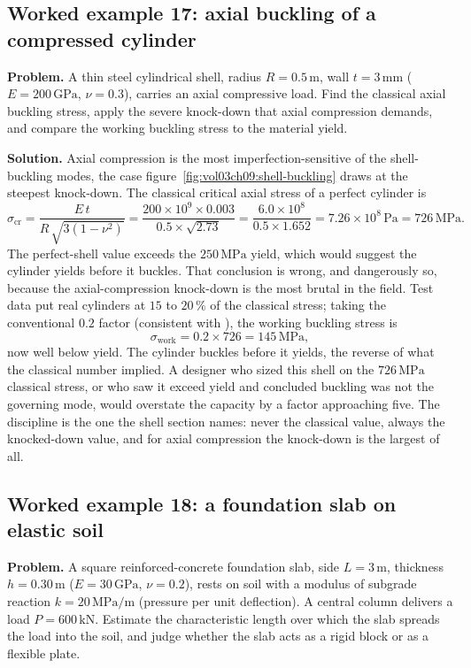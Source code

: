 \subsection*{Worked example 17: axial buckling of a compressed cylinder}

\textbf{Problem.} A thin steel cylindrical shell, radius $R = 0.5\,\si{
\meter}$, wall $t = 3\,\si{\milli\meter}$ ($E = 200\,\text{GPa}$,
$\nu = 0.3$), carries an axial compressive load. Find the classical axial
buckling stress, apply the severe knock-down that axial compression
demands, and compare the working buckling stress to the material yield.

\textbf{Solution.} Axial compression is the most imperfection-sensitive of
the shell-buckling modes, the case figure~\ref{fig:vol03ch09:shell-buckling}
draws at the steepest knock-down. The classical critical axial stress of a
perfect cylinder is
\[
\sigma_{\text{cr}} = \frac{E\, t}{R\,\sqrt{3(1-\nu^2)}}
= \frac{200\times 10^9 \times 0.003}{0.5 \times \sqrt{2.73}}
= \frac{6.0\times 10^8}{0.5 \times 1.652}
= 7.26\times 10^{8}\,\text{Pa} = 726\,\text{MPa}.
\]
The perfect-shell value exceeds the $250\,\text{MPa}$ yield, which would
suggest the cylinder yields before it buckles. That conclusion is wrong,
and dangerously so, because the axial-compression knock-down is the most
brutal in the field. Test data put real cylinders at $15$ to $20\,\%$ of
the classical stress; taking the conventional $0.2$ factor (consistent
with ), the working buckling stress is
\[
\sigma_{\text{work}} = 0.2 \times 726 = 145\,\text{MPa},
\]
now well below yield. The cylinder buckles before it yields, the reverse
of what the classical number implied. A designer who sized this shell on
the $726\,\text{MPa}$ classical stress, or who saw it exceed yield and
concluded buckling was not the governing mode, would overstate the
capacity by a factor approaching five. The discipline is the one the shell
section names: never the classical value, always the knocked-down value,
and for axial compression the knock-down is the largest of all.

\subsection*{Worked example 18: a foundation slab on elastic soil}

\textbf{Problem.} A square reinforced-concrete foundation slab, side
$L = 3\,\si{\meter}$, thickness $h = 0.30\,\si{\meter}$ ($E = 30\,\text{
GPa}$, $\nu = 0.2$), rests on soil with a modulus of subgrade reaction
$k = 20\,\si{\mega\pascal}/\si{\meter}$ (pressure per unit deflection). A
central column delivers a load $P = 600\,\text{kN}$. Estimate the
characteristic length over which the slab spreads the load into the soil,
and judge whether the slab acts as a rigid block or as a flexible plate.

